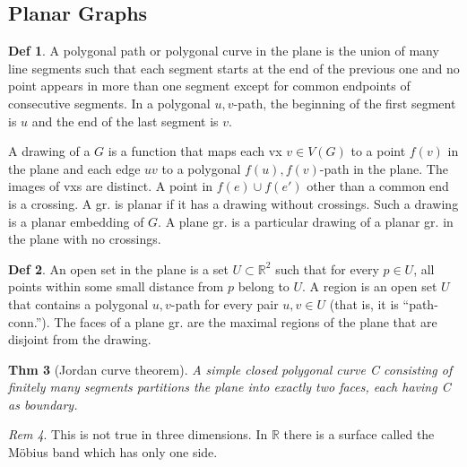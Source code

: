 \documentclass[11pt, fleqn, a4paper, landscape]{article}
\theoremstyle{plain} %
\newtheorem{thm}{Thm}
\theoremstyle{remark} %
\newtheorem{rem}[thm]{Rem}
\theoremstyle{definition} %
\newtheorem{defi}[thm]{Def}
\begin{document}
\begin{multicols}{5}
\section{Planar Graphs}
\begin{defi}
A polygonal path or polygonal curve in the plane is the union of many line segments such that each segment starts at the end of the previous one and no point appears in more than one segment except for common endpoints of consecutive segments. In a polygonal $u, v$-path, the beginning of the first segment is $u$ and the end of the last segment is $v$.

A drawing of a $G$ is a function that maps each vx $v\in V (G)$ to a point $f(v)$ in the plane and each edge $uv$ to a polygonal $f(u), f(v)$-path in the plane. The images of vxs are distinct.
A point in $f(e)\cup f(e')$ other than a common end is a crossing. A gr. is planar if it has a drawing without crossings. Such a drawing is a planar embedding of $G$. A plane gr. is a particular drawing of a planar gr. in the plane with no crossings.
\end{defi}
\addtocounter{thm}{1}
\addtocounter{thm}{1}

\begin{defi}
An open set in the plane is a set $U \subset \mathbb{R}^2$ such that for every $p\in U$, all points within some small distance from $p$ belong to $U$. A region is an open set $U$ that contains a polygonal $u, v$-path for every pair $u, v \in U$ (that is, it is “path-conn.”). The faces of a plane gr. are the maximal regions of the plane that are disjoint from the drawing.
\end{defi}

\begin{thm}[Jordan curve theorem]
A simple closed polygonal curve C consisting of finitely
many segments partitions the plane into exactly two faces, each having C as boundary.
\end{thm}

\begin{rem}
This is not true in three dimensions. In $\mathbb{R}$ there is a surface called the Möbius band which has only one side.
\end{rem}


\end{multicols}
\end{document}
